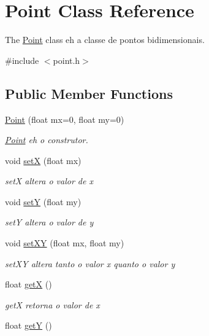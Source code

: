 \hypertarget{classPoint}{}\section{Point Class Reference}
\label{classPoint}


The \hyperlink{classPoint}{Point} class eh a classe de pontos bidimensionais.  




{\ttfamily \#include $<$point.\+h$>$}

\subsection*{Public Member Functions}
\begin{DoxyCompactItemize}
\item 
\hyperlink{classPoint_a30773ae254834ba9ce4661bf492cd07a}{Point} (float mx=0, float my=0)
\begin{DoxyCompactList}\small\item\em \hyperlink{classPoint}{Point} eh o construtor. \end{DoxyCompactList}\item 
void \hyperlink{classPoint_acee4acaa1d515e9973145f977e500fe6}{setX} (float mx)
\begin{DoxyCompactList}\small\item\em setX altera o valor de x \end{DoxyCompactList}\item 
void \hyperlink{classPoint_a756b3f64d961a5059302f42e1fcf2332}{setY} (float my)
\begin{DoxyCompactList}\small\item\em setY altera o valor de y \end{DoxyCompactList}\item 
void \hyperlink{classPoint_afe2b937778d9fe5c135ab61de91271e9}{set\+XY} (float mx, float my)
\begin{DoxyCompactList}\small\item\em set\+XY altera tanto o valor x quanto o valor y \end{DoxyCompactList}\item 
float \hyperlink{classPoint_acc27466778cc87a662bba40268c4c0c8}{getX} ()
\begin{DoxyCompactList}\small\item\em getX retorna o valor de x \end{DoxyCompactList}\item 
float \hyperlink{classPoint_a3cccbca94719ddde353cce86ce0e2f64}{getY} ()

\end{DoxyCompactItemize}
